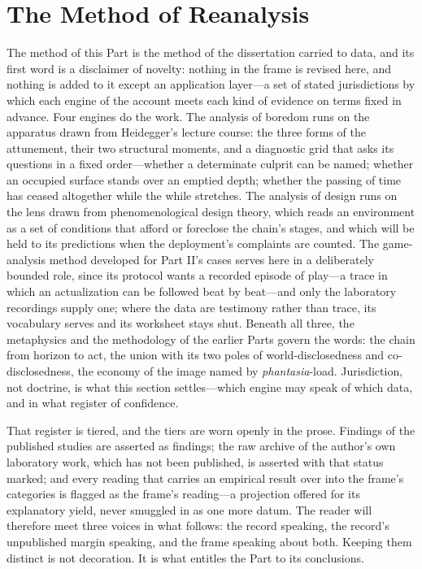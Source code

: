 
\section{The Method of Reanalysis}

The method of this Part is the method of the dissertation carried to data, and its first word is a disclaimer of novelty: nothing in the frame is revised here, and nothing is added to it except an application layer---a set of stated jurisdictions by which each engine of the account meets each kind of evidence on terms fixed in advance. Four engines do the work. The analysis of boredom runs on the apparatus drawn from Heidegger's lecture course: the three forms of the attunement, their two structural moments, and a diagnostic grid that asks its questions in a fixed order---whether a determinate culprit can be named; whether an occupied surface stands over an emptied depth; whether the passing of time has ceased altogether while the while stretches. The analysis of design runs on the lens drawn from phenomenological design theory, which reads an environment as a set of conditions that afford or foreclose the chain's stages, and which will be held to its predictions when the deployment's complaints are counted. The game-analysis method developed for Part II's cases serves here in a deliberately bounded role, since its protocol wants a recorded episode of play---a trace in which an actualization can be followed beat by beat---and only the laboratory recordings supply one; where the data are testimony rather than trace, its vocabulary serves and its worksheet stays shut. Beneath all three, the metaphysics and the methodology of the earlier Parts govern the words: the chain from horizon to act, the union with its two poles of world-disclosedness and co-disclosedness, the economy of the image named by \textit{phantasia}-load. Jurisdiction, not doctrine, is what this section settles---which engine may speak of which data, and in what register of confidence.

That register is tiered, and the tiers are worn openly in the prose. Findings of the published studies are asserted as findings; the raw archive of the author's own laboratory work, which has not been published, is asserted with that status marked; and every reading that carries an empirical result over into the frame's categories is flagged as the frame's reading---a projection offered for its explanatory yield, never smuggled in as one more datum. The reader will therefore meet three voices in what follows: the record speaking, the record's unpublished margin speaking, and the frame speaking about both. Keeping them distinct is not decoration. It is what entitles the Part to its conclusions.

